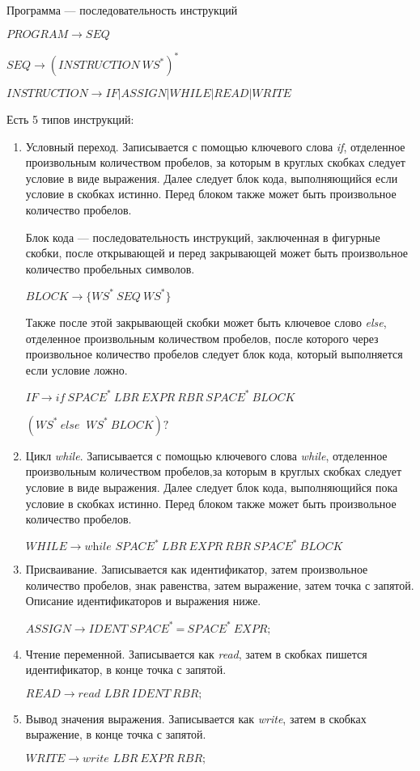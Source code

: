 \documentclass[14pt]{extarticle}
\begin{document}
Программа --- последовательность инструкций

$PROGRAM \to SEQ$

$SEQ \to (INSTRUCTION\ WS^*)^*$

$INSTRUCTION \to IF | ASSIGN | WHILE | READ | WRITE$

Есть 5 типов инструкций:
\begin{enumerate}
    \item Условный переход. Записывается с помощью ключевого слова \textit{if}, отделенное
          произвольным количеством пробелов, за которым в круглых
          скобках следует условие в виде выражения. Далее следует блок кода, выполняющийся если условие
          в скобках истинно. Перед блоком также может быть произвольное количество пробелов.

          Блок кода --- последовательность инструкций, заключенная в фигурные скобки, после
          открывающей и перед закрывающей может быть произвольное количество пробельных символов.

          $BLOCK \to \{WS ^ *\ SEQ\ WS ^*\}$

          Также после этой закрывающей скобки может быть ключевое слово \textit{else}, отделенное
          произвольным количеством пробелов, после которого через произвольное количество пробелов
          следует блок кода, который выполняется если условие ложно.

          $IF \to \textit{if}\ SPACE^*\ LBR\ EXPR\ RBR \ SPACE^*\ BLOCK$

          $(WS^*\ \textit{else }\ WS ^* \ BLOCK)?$

    \item Цикл \textit{while}. Записывается с помощью ключевого слова \textit{while}, отделенное
          произвольным количеством пробелов,за которым в круглых
          скобках следует условие в виде выражения. Далее следует блок кода, выполняющийся пока условие
          в скобках истинно. Перед блоком также может быть произвольное количество пробелов.

          $WHILE \to \textit{while } SPACE ^ *\ LBR\ EXPR\ RBR \ SPACE ^ *\ BLOCK$

    \item Присваивание. Записывается как идентификатор, затем произвольное количество пробелов, знак
          равенства, затем выражение, затем точка с запятой. Описание идентификаторов и выражения ниже.

          $ASSIGN \to IDENT\ SPACE^*\ \textbf{=}\ SPACE^*\ EXPR\text{;}$

    \item Чтение переменной. Записывается как \textit{read}, затем в скобках пишется идентификатор, в
          конце точка с запятой.

          $READ \to \textit{read } LBR\ IDENT \ RBR \text{;}$

    \item Вывод значения выражения. Записывается как \textit{write}, затем в скобках выражение, в
          конце точка с запятой.

          $WRITE \to \textit{write } LBR\ EXPR \ RBR \text{;}$
\end{enumerate}
\end{document}
